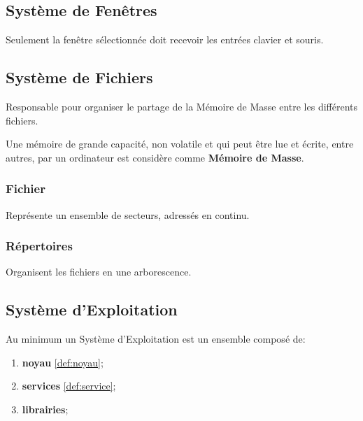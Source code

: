 \documentclass{article}
\begin{document}
\subsection{Système de Fenêtres}
\begin{definition}\label{def:systemeFenetres}
    Seulement la fenêtre sélectionnée doit recevoir les entrées clavier et souris.
\end{definition}

\subsection{Système de Fichiers}
\begin{definition}\label{def:systemeFichiers}
    Responsable pour organiser le partage de la Mémoire de Masse entre les différents fichiers.

    \begin{remark}
        Une mémoire de grande capacité, non volatile et qui peut être lue et écrite, entre autres, par un ordinateur est considère comme \textbf{Mémoire de Masse}.
    \end{remark}
\end{definition}
\subsubsection{Fichier}
\begin{definition}\label{def:fichiers}
    Représente un ensemble de secteurs, adressés en continu. 
\end{definition}

\subsubsection{Répertoires}
\begin{definition}\label{def:repertoires}
    Organisent les fichiers en une arborescence.
\end{definition}


\subsection{Système d'Exploitation}
\begin{definition}\label{def:systemeExploitation}
    Au minimum un Système d'Exploitation est un ensemble composé de:
    \begin{enumerate}[noitemsep]
        \item \textbf{noyau} \ref{def:noyau};
        \item \textbf{services} \ref{def:service};
        \item \textbf{librairies};
    \end{enumerate}
\end{definition}
\end{document}
